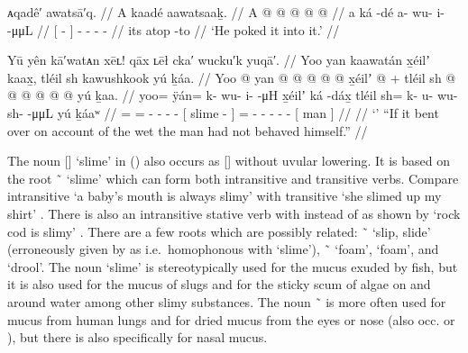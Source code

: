 \ex\label{ex:89-94-poke-in}%
%
\begingl
	\glpreamble	ᴀqadê′ awatsā′q. //
	\glpreamble	A kaadé aawatsaaḵ. //
	\gla	{} A  @ {} {}  @ {} @ {} @ {} @ {} //
	\glb	{} a ká -dé {} a- wu- i-  -μμL //
	\glc	{}[   - {}] - - -  - //
	\gld	{} its atop -to {}  {} {} {} {} //
	\glft	‘He poked it into it.’
		//
\endgl
\xe

\ex\label{ex:89-95-}%
%
\begingl
	\glpreamble	Yū yên kā′watᴀn xēʟ! qāx ʟēł cka′ wucku′k yuqā′. //
	\glpreamble	Yoo yan kaawatán x̱éilʼ kaax̱, tléil sh kawushkook yú ḵáa. //
	\gla	Yoo @ yan @  @ {} @ {} @ {} @ {}
		{} x̱éilʼ  @ {} {} +
		tléil sh @  @ {} @ {} @ {} @ {} @ {}
		{} yú ḵaa. {} //
	\glb	yoo= ÿán= k- wu- i-  -μH
		{} x̱éilʼ ká -dáx̱ {}
		tléil sh= k- u- wu- sh-  -μμL
		{} yú ḵáaʷ {} //
	\glc	{}= = - - -  -
		{}[ slime  - {}]
		 = - - - -  -
		{}[  man {}] //
	\gld	 //
	\glft	‘’\newline
		“If it bent over on account of the wet the man had not behaved himself.”
		//
\endgl
\xe

The noun  [] ‘slime’ in (\lastx) also occurs as  [] without uvular lowering.
It is based on the root  \~\  ‘slime’ which can form both intransitive and transitive verbs.
Compare intransitive  ‘a baby’s mouth is always slimy’ \parencite[196.2729]{story-naish:1973} with transitive  ‘she slimed up my shirt’ \parencite[196.2731]{story-naish:1973}.
There is also an intransitive stative verb with  instead of  as shown by  ‘rock cod is slimy’ \parencite[196.2730]{story-naish:1973}.
There are a few roots which are possibly related:  \~\  ‘slip, slide’ (erroneously given by \citeauthor{story-naish:1973} as  i.e.\ homophonous with ‘slime’),  \~\  ‘foam’,   ‘foam’, and  ‘drool’.
The noun  ‘slime’ is stereotypically used for the mucus exuded by fish, but it is also used for the mucus of slugs and for the sticky scum of algae on and around water among other slimy substances.
The noun  \~\  is more often used for mucus from human lungs and  for dried mucus from the eyes or nose (also occ.
 or ), but there is also  specifically for nasal mucus.

